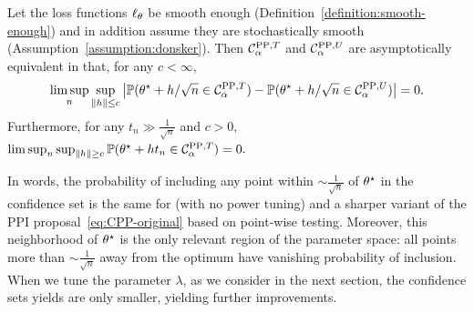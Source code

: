 
\begin{theorem}
  \label{theorem:confidence-set-equivalence}
  Let the loss functions $\ell_\theta$ be smooth enough
  (Definition~\ref{definition:smooth-enough}) and
  in addition assume they are stochastically smooth
  (Assumption~\ref{assumption:donsker}).  Then $\mathcal{C}_\alpha^{\mathrm{PP},T}$
  and $\mathcal{C}_\alpha^{\mathrm{PP},U}$ are asymptotically equivalent in that, for
  any $c < \infty$,
  \begin{equation*}
    \limsup_n
    \sup_{\left\|{h}\right\| \le c}
    \left|
    \mathbb{P}(\theta^\star + h/\sqrt{n} \in \mathcal{C}_\alpha^{\mathrm{PP},T})
    - \mathbb{P}(\theta^\star + h/\sqrt{n} \in \mathcal{C}_\alpha^{\mathrm{PP},U}) \right|
    = 0.
  \end{equation*}
  Furthermore, for any $t_n \gg \frac{1}{\sqrt{n}}$ and $c>0$, $\limsup_n
    \sup_{\left\|{h}\right\| \ge c}
    \mathbb{P}(\theta^\star + h t_n \in \mathcal{C}_\alpha^{\mathrm{PP},T})
    = 0.$
\end{theorem}

In words, the probability of including any point within $\sim
\frac{1}{\sqrt{n}}$ of $\theta^\star$ in the confidence set is the same for \ppipp (with no power tuning) and a sharper variant of the
PPI proposal~\eqref{eq:CPP-original}
based on point-wise testing.
%
Moreover, this neighborhood of $\theta^\star$ is
the only relevant region of the parameter space: all points more than $\sim
\frac{1}{\sqrt{n}}$ away from the optimum have vanishing probability of
inclusion.
%
When we tune the parameter $\lambda$, as we consider in the next section,
the confidence sets \ppipp yields are only smaller, yielding
further improvements.
